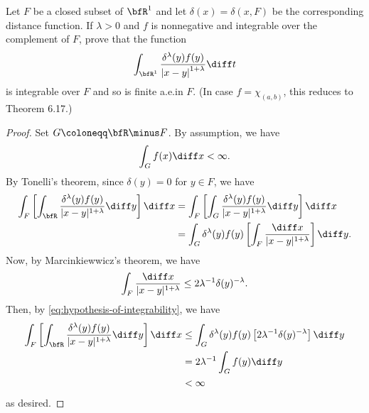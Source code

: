 \begin{problem}
Let $F$ be a closed subset of $\bfR^1$ and let $\delta(x)=\delta(x,F)$ be
the corresponding distance function. If $\lambda>0$ and $f$ is nonnegative
and integrable over the complement of $F$, prove that the function
\[
\int_{\bfR^1}\frac{\delta^\lambda(y)f(y)}{\left|x-y\right|^{1+\lambda}}\diff
t
\]
is integrable over $F$ and so is finite a.e.\@ in $F$. (In case
$f=\chi_{(a,b)}$, this reduces to Theorem 6.17.)
\end{problem}
\begin{proof}
Set $G\coloneqq\bfR\minus F$. By assumption, we have
\begin{equation}
  \label{eq:hypothesis-of-integrability}
\int_Gf(x)\diff x<\infty.
\end{equation}
By Tonelli's theorem, since $\delta(y)=0$ for $y\in F$, we have
\begin{equation}
\label{eq:application-of-tonelli}
\begin{aligned}[t]
\int_F\left[\int_\bfR\frac{\delta^\lambda(y)f(y)}{|x-y|^{1+\lambda}}\diff
  y\right]\diff x
&=\int_F\left[\int_G\frac{\delta^\lambda(y)f(y)}{|x-y|^{1+\lambda}}\diff
  y\right]\diff x\\
&=\int_G\delta^\lambda(y)f(y)\left[\int_F\frac{\diff
    x}{|x-y|^{1+\lambda}}\right]\diff y.
\end{aligned}
\end{equation}
Now, by Marcinkiewwicz's theorem, we have
\begin{equation}
  \label{eq:application-of-marcinkiewicz}
\int_F\frac{\diff x}{|x-y|^{1+\lambda}}\leq
2\lambda^{-1}\delta(y)^{-\lambda}.
\end{equation}
Then, by \eqref{eq:hypothesis-of-integrability}, we have
\begin{equation}
\label{eq:application-of-fubini-2}
\begin{aligned}[t]
 \int_F\left[\int_\bfR\frac{\delta^{\lambda}(y)f(y)}{|x-y|^{1+\lambda}}\diff
y\right]\diff x
&\leq\int_G\delta^\lambda(y)f(y)\left[2\lambda^{-1}\delta(y)^{-\lambda}\right]\diff
y\\
&=2\lambda^{-1}\int_Gf(y)\diff y\\
&<\infty
\end{aligned}
\end{equation}
as desired.
\end{proof}
\newpage

